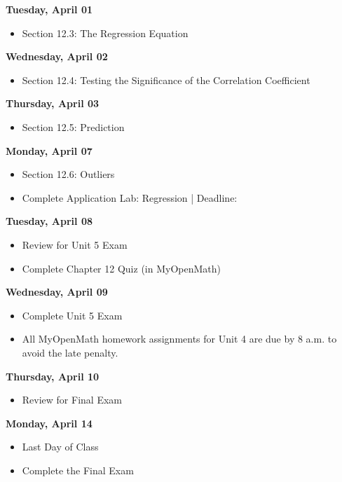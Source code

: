 \documentclass[11pt]{article}
\begin{document}
\textbf{Tuesday, April 01}

\begin{itemize}
\item Section 12.3: The Regression Equation
\end{itemize}

\textbf{Wednesday, April 02}

\begin{itemize}
\item Section 12.4: Testing the Significance of the Correlation Coefficient
\end{itemize}

\textbf{Thursday, April 03}

\begin{itemize}
\item Section 12.5: Prediction
\end{itemize}

\textbf{Monday, April 07}

\begin{itemize}
\item Section 12.6: Outliers
\item Complete Application Lab: Regression | Deadline:
\end{itemize}

\textbf{Tuesday, April 08}

\begin{itemize}
\item Review for Unit 5 Exam
\item Complete Chapter 12 Quiz (in MyOpenMath)
\end{itemize}

\textbf{Wednesday, April 09}

\begin{itemize}
\item Complete Unit 5 Exam
\item All MyOpenMath homework assignments for Unit 4 are due by 8 a.m. to avoid the late penalty.
\end{itemize}

\textbf{Thursday, April 10}

\begin{itemize}
\item Review for Final Exam
\end{itemize}

\textbf{Monday, April 14}

\begin{itemize}
\item Last Day of Class
\item Complete the Final Exam
\end{itemize}
\end{document}
